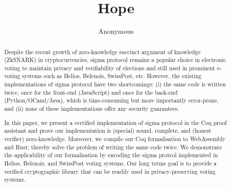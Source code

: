 \documentclass[conference,compsoc]{IEEEtran}
\begin{document}
\title{Hope}

\author{Anonymous}

\maketitle

\begin{abstract}
  Despite the recent growth of zero-knowledge succinct argument 
  of knowledge (ZkSNARK) in cryptocurrencies, 
  sigma protocol remains a popular choice in electronic voting to maintain privacy 
  and verifiability of elections and still used in prominent e-voting systems such as 
  Helios, Belenois, SwissPost, etc. However, 
  the existing implementations of sigma protocol have two 
  shortcomings: (i) the same code is written twice, once for the front-end (JavaScript)
  and once for the back-end (Python/OCaml/Java), which is time-consuming but more importantly error-prone, 
  and (ii) none of these implementations offer any security guarantees. 
  
  In this paper, we present a certified implementation of sigma protocol in the Coq proof assistant and
  prove our implementation is (special) sound, complete, and 
  (honest verifier) zero-knowledge. Moreover, 
  we compile our Coq formalisation to WebAssembly and Rust; 
  thereby solve the problem of writing the same code twice. 
  We demonstrate the applicability of our
  formalisation by encoding the sigma protcol implemented in 
  Helios, Belenois, and SwissPost voting systems. 
  Our long terms goal is to provide a verified cryptographic library that can be 
  readily used in privacy-preserving voting systems.
\end{abstract}





%
\IEEEpeerreviewmaketitle



\iffalse
\end{document}
